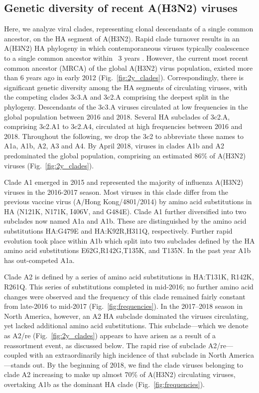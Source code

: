 \subsection*{Genetic diversity of recent A(H3N2) viruses}
Here, we analyze viral clades, representing clonal descendants of a single common ancestor, on the HA segment of A(H3N2).
Rapid clade turnover results in an A(H3N2) HA phylogeny in which contemporaneous viruses typically coalescence to a single common ancestor within ~3 years \citep{bedford_global_2015}.
However, the current most recent common ancestor (MRCA) of the global A(H3N2) virus population, existed more than 6 years ago in early 2012 (Fig.~\ref{fig:2y_clades}).
Correspondingly, there is significant genetic diversity among the HA segments of circulating viruses, with the competing clades 3c3.A and 3c2.A comprising the deepest split in the phylogeny.
Descendants of the 3c3.A viruses circulated at low frequencies in the global population between 2016 and 2018.
Several HA subclades of 3c2.A, comprising 3c2.A1 to 3c2.A4, circulated at high frequencies between 2016 and 2018.
Throughout the following, we drop the 3c2 to abbreviate these names to A1a, A1b, A2, A3 and A4.
By April 2018, viruses in clades A1b and A2 predominated the global population, comprising an estimated 86\% of A(H3N2) viruses (Fig.~\ref{fig:2y_clades}).

Clade A1 emerged in 2015 and represented the majority of influenza A(H3N2) viruses in the 2016-2017 season.
Most viruses in this clade differ from the previous vaccine virus (A/Hong Kong/4801/2014) by amino acid substitutions in HA (N121K, N171K, I406V, and G484E).
Clade A1 further diversified into two subclades now named A1a and A1b.
These are distinguished by the amino acid substitutions HA:G479E and HA:K92R,H311Q, respectively.
Further rapid evolution took place within A1b which split into two subclades defined by the HA amino acid substitutions E62G,R142G,T135K, and T135N.
In the past year A1b has out-competed A1a.

Clade A2 is defined by a series of amino acid substitutions in HA:T131K, R142K, R261Q.
This series of substitutions completed in mid-2016; no further amino acid changes were observed and the frequency of this clade remained fairly constant from late-2016 to mid-2017 (Fig.~\ref{fig:frequencies}).
In the 2017--2018 season in North America, however, an A2 HA subclade dominated the viruses circulating, yet lacked additional amino acid substitutions.
This subclade—which we denote as A2/re (Fig.~\ref{fig:2y_clades}) appears to have arisen as a result of a reassortment event, as discussed below.
The rapid rise of subclade A2/re---coupled with an extraordinarily high incidence of that subclade in North America---stands out.
By the beginning of 2018, we find the clade viruses belonging to clade A2 increasing to make up almost 70\% of A(H3N2) circulating viruses, overtaking A1b as the dominant HA clade (Fig.~\ref{fig:frequencies}).

